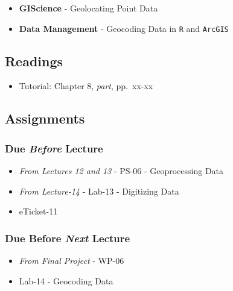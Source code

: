 \documentclass[]{book}
\providecommand{\tightlist}{%
  \setlength{\itemsep}{0pt}\setlength{\parskip}{0pt}}
\begin{document}
\begin{itemize}
\tightlist
\item
  \textbf{GIScience} - Geolocating Point Data
\item
  \textbf{Data Management} - Geocoding Data in \texttt{R} and \texttt{ArcGIS}
\end{itemize}

\hypertarget{readings-15}{%
\subsection*{Readings}\label{readings-15}}

\begin{itemize}
\tightlist
\item
  Tutorial: Chapter 8, \emph{part}, pp.~xx-xx
\end{itemize}

\hypertarget{assignments-16}{%
\subsection*{Assignments}\label{assignments-16}}

\hypertarget{due-before-lecture-14}{%
\subsubsection*{\texorpdfstring{Due \emph{Before} Lecture}{Due Before Lecture}}\label{due-before-lecture-14}}

\begin{itemize}
\tightlist
\item
  \emph{From Lectures 12 and 13} - PS-06 - Geoprocessing Data
\item
  \emph{From Lecture-14} - Lab-13 - Digitizing Data
\item
  eTicket-11
\end{itemize}

\hypertarget{due-before-next-lecture-13}{%
\subsubsection*{\texorpdfstring{Due Before \emph{Next} Lecture}{Due Before Next Lecture}}\label{due-before-next-lecture-13}}

\begin{itemize}
\tightlist
\item
  \emph{From Final Project} - WP-06
\item
  Lab-14 - Geocoding Data
\end{itemize}
\end{document}
